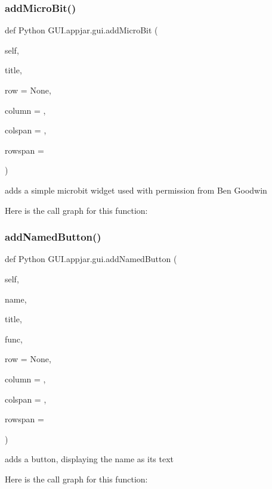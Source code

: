 \subsubsection{\texorpdfstring{add\+Micro\+Bit()}{addMicroBit()}}
{\footnotesize\ttfamily def Python G\+U\+I.\+appjar.\+gui.\+add\+Micro\+Bit (\begin{DoxyParamCaption}\item[{}]{self,  }\item[{}]{title,  }\item[{}]{row = {\ttfamily None},  }\item[{}]{column = {},  }\item[{}]{colspan = {},  }\item[{}]{rowspan = {} }\end{DoxyParamCaption})}

\begin{DoxyVerb}adds a simple microbit widget
     used with permission from Ben Goodwin \end{DoxyVerb}
 Here is the call graph for this function\+:
\mbox{\label{class_python_01_g_u_i_1_1appjar_1_1gui_a0037b0964397da51156eaac0f625867a}} 
\subsubsection{\texorpdfstring{add\+Named\+Button()}{addNamedButton()}}
{\footnotesize\ttfamily def Python G\+U\+I.\+appjar.\+gui.\+add\+Named\+Button (\begin{DoxyParamCaption}\item[{}]{self,  }\item[{}]{name,  }\item[{}]{title,  }\item[{}]{func,  }\item[{}]{row = {\ttfamily None},  }\item[{}]{column = {},  }\item[{}]{colspan = {},  }\item[{}]{rowspan = {} }\end{DoxyParamCaption})}

\begin{DoxyVerb}adds a button, displaying the name as its text \end{DoxyVerb}
 Here is the call graph for this function\+:
\mbox{\label{class_python_01_g_u_i_1_1appjar_1_1gui_a4a85a0ce251111a1200b99fade4799a8}} 
